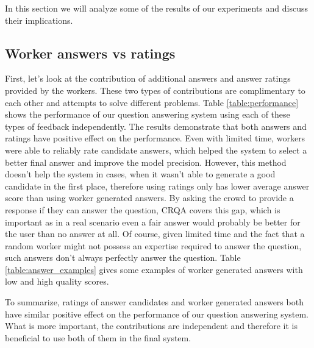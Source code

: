
In this section we will analyze some of the results of our experiments and discuss their implications.

\subsection{Worker answers vs ratings}
\label{sec:analysis:answers_vs_ratings}

First, let's look at the contribution of additional answers and answer ratings provided by the workers.
These two types of contributions are complimentary to each other and attempts to solve different problems.
Table \ref{table:performance} shows the performance of our question answering system using each of these types of feedback independently.
The results demonstrate that both answers and ratings have positive effect on the performance.
Even with limited time, workers were able to reliably rate candidate answers, which helped the system to select a better final answer and improve the model precision.
However, this method doesn't help the system in cases, when it wasn't able to generate a good candidate in the first place, therefore using ratings only has lower average answer score than using worker generated answers.
By asking the crowd to provide a response if they can answer the question, CRQA covers this gap, which is important as in a real scenario even a fair answer would probably be better for the user than no answer at all.
Of course, given limited time and the fact that a random worker might not possess an expertise required to answer the question, such answers don't always perfectly answer the question.
Table \ref{table:answer_examples} gives some examples of worker generated answers with low and high quality scores.

To summarize, ratings of answer candidates and worker generated answers both have similar positive effect on the performance of our question answering system.
What is more important, the contributions are independent and therefore it is beneficial to use both of them in the final system.

